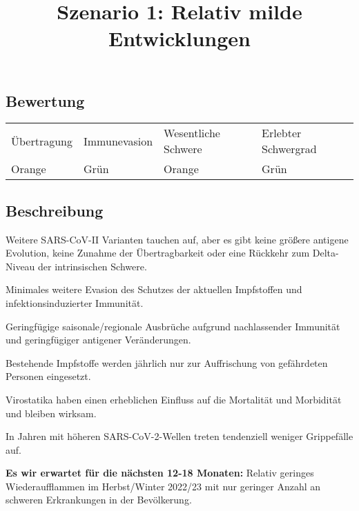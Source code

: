\documentclass{article}
\begin{document}
\title{Szenario 1: Relativ milde Entwicklungen}

\maketitle





\subsection{Bewertung}\label{H348924}



\begin{tabu} to \textwidth { |X|X|X|X| }
\hline



Übertragung   & Immunevasion & Wesentliche Schwere & Erlebter Schwergrad
 \\


Orange & Grün & Orange & Grün
 \\
\hline

\end{tabu}




\subsection{Beschreibung}\label{H7334057}



Weitere SARS-CoV-II Varianten tauchen auf, aber es gibt keine größere antigene Evolution, keine Zunahme der Übertragbarkeit oder eine Rückkehr zum Delta-Niveau der intrinsischen Schwere. 


Minimales weitere Evasion des Schutzes der aktuellen Impfstoffen und infektionsinduzierter Immunität. 


Geringfügige saisonale/regionale Ausbrüche aufgrund nachlassender Immunität und geringfügiger antigener Veränderungen. 


Bestehende Impfstoffe werden jährlich nur zur Auffrischung von gefährdeten Personen eingesetzt. 


Virostatika haben einen erheblichen Einfluss auf die Mortalität und Morbidität und bleiben wirksam. 


In Jahren mit höheren SARS-CoV-2-Wellen treten tendenziell weniger Grippefälle auf. 


\textbf{Es wir erwartet für die nächsten 12-18 Monaten:} Relativ geringes Wiederaufflammen im Herbst/Winter 2022/23 mit nur geringer Anzahl an schweren Erkrankungen in der Bevölkerung.
\end{document}
